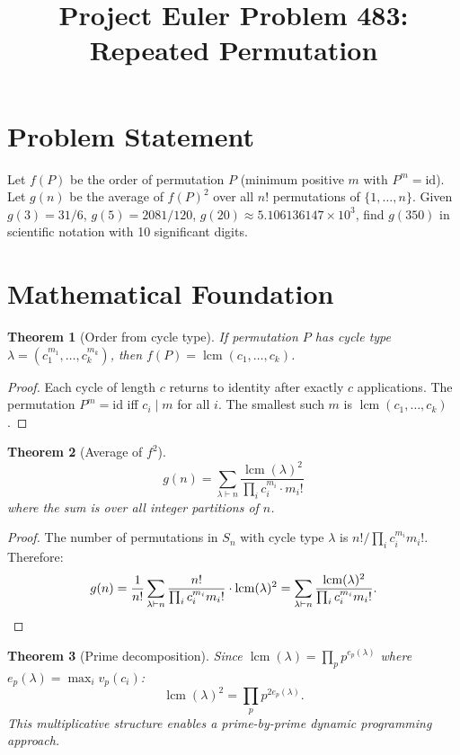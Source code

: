 \documentclass[12pt]{article}
\title{Project Euler Problem 483: Repeated Permutation}
\author{}
\date{}
\newtheorem{theorem}{Theorem}
\begin{document}
\maketitle

\section{Problem Statement}
Let $f(P)$ be the order of permutation $P$ (minimum positive $m$ with $P^m = \mathrm{id}$). Let $g(n)$ be the average of $f(P)^2$ over all $n!$ permutations of $\{1,\ldots,n\}$. Given $g(3)=31/6$, $g(5)=2081/120$, $g(20)\approx 5.106136147\times 10^3$, find $g(350)$ in scientific notation with 10 significant digits.

\section{Mathematical Foundation}

\begin{theorem}[Order from cycle type]
If permutation $P$ has cycle type $\lambda = (c_1^{m_1}, \ldots, c_k^{m_k})$, then $f(P) = \operatorname{lcm}(c_1, \ldots, c_k)$.
\end{theorem}

\begin{proof}
Each cycle of length $c$ returns to identity after exactly $c$ applications. The permutation $P^m = \mathrm{id}$ iff $c_i \mid m$ for all $i$. The smallest such $m$ is $\operatorname{lcm}(c_1, \ldots, c_k)$.
\end{proof}

\begin{theorem}[Average of $f^2$]
\[
g(n) = \sum_{\lambda\vdash n} \frac{\operatorname{lcm}(\lambda)^2}{\prod_i c_i^{m_i}\cdot m_i!}
\]
where the sum is over all integer partitions of $n$.
\end{theorem}

\begin{proof}
The number of permutations in $S_n$ with cycle type $\lambda$ is $n!/\prod_i c_i^{m_i}m_i!$. Therefore:
\[
g(n) = \frac{1}{n!}\sum_{\lambda\vdash n}\frac{n!}{\prod_i c_i^{m_i}m_i!}\cdot\operatorname{lcm}(\lambda)^2 = \sum_{\lambda\vdash n}\frac{\operatorname{lcm}(\lambda)^2}{\prod_i c_i^{m_i}m_i!}. \qedhere
\]
\end{proof}

\begin{theorem}[Prime decomposition]
Since $\operatorname{lcm}(\lambda) = \prod_p p^{e_p(\lambda)}$ where $e_p(\lambda) = \max_i v_p(c_i)$:
\[
\operatorname{lcm}(\lambda)^2 = \prod_p p^{2e_p(\lambda)}.
\]
This multiplicative structure enables a prime-by-prime dynamic programming approach.
\end{theorem}
\end{document}
